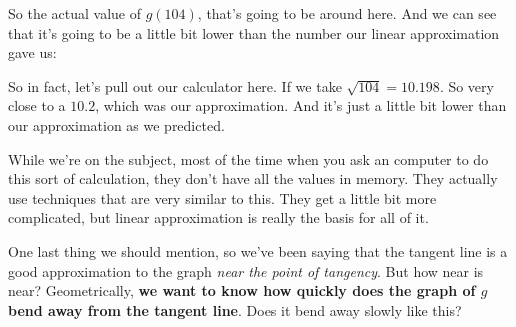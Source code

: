 \documentclass[pdftex, brazil, 12pt, twoside]{article}
\begin{document}
So the actual value of $g(104)$, that's going to be around here.
And we can see that it's going to be
a little bit lower than the number our linear approximation
gave us:

\begin{figure}[H]
  \begin{center}
  \end{center}
\end{figure}

So in fact, let's pull out our calculator here.
If we take $\sqrt{104}= 10.198$.
So very close to a $10.2$, which was our approximation.
And it's just a little bit lower than our approximation
as we predicted.

While we're on the subject, most of the time
when you ask an computer to do this sort of calculation,
they don't have all the values in memory.
They actually use techniques that are very similar to this.
They get a little bit more complicated,
but linear approximation is really the basis for all of it.

One last thing we should mention,
so we've been saying that the tangent
line is a good approximation to the graph
\emph{near the point of tangency}.
But how near is near?
Geometrically, \textbf{we want to know how quickly does the graph of $g$
bend away from the tangent line}.
Does it bend away slowly like this?

\begin{figure}[H]
  \begin{center}
  \end{center}
\end{figure}
\end{document}
